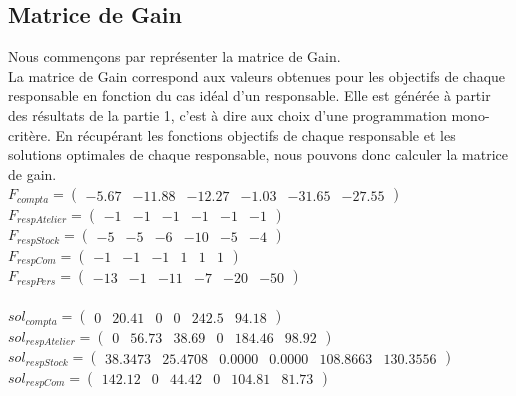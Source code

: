 \documentclass[a4paper, 11pt]{article}
\begin{document}
\subsection{Matrice de Gain}
Nous commençons par représenter la matrice de Gain.\\
La matrice de Gain correspond aux valeurs obtenues pour les objectifs de chaque responsable en fonction du cas idéal d’un responsable. Elle est générée à partir des résultats de la partie 1, c’est à dire aux choix d’une programmation mono-critère.
En récupérant les fonctions objectifs de chaque responsable et les solutions optimales de chaque responsable, nous pouvons donc calculer la matrice de gain.\\
$F_{compta} =  \begin{pmatrix}-5.67  &-11.88  &-12.27  &-1.03  &-31.65  &-27.55 \end{pmatrix} $ \\
$F_{respAtelier} =  \begin{pmatrix}-1 & -1 & -1 & -1 & -1 & -1 \end{pmatrix} $ \\
$F_{respStock} =  \begin{pmatrix}-5 & -5 & -6 & -10 & -5 & -4 \end{pmatrix} $ \\
$F_{respCom} = \begin{pmatrix}-1 &-1 &-1 &1 &1 &1 \end{pmatrix} $ \\
$F_{respPers} = \begin{pmatrix}-13 &-1 &-11 &-7 &-20 &-50 \end{pmatrix} $ \\\\
$sol_{compta}  =  \begin{pmatrix}0 &20.41 &0 &0 &242.5 &94.18 \end{pmatrix} $ \\
$sol_{respAtelier} =  \begin{pmatrix}0 &56.73 &38.69 &0 &184.46 &98.92 \end{pmatrix} $ \\
$sol_{respStock} =  \begin{pmatrix}38.3473 &25.4708 &0.0000 &0.0000 &108.8663 &130.3556 \end{pmatrix} $ \\
$sol_{respCom}  =  \begin{pmatrix}142.12 &0 &44.42 &0 &104.81 &81.73 \end{pmatrix} $ \\
\end{document}

